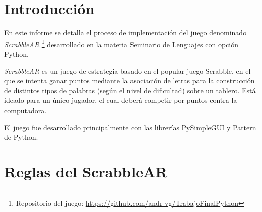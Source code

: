 \documentclass[11pt,fleqn]{book} %
\begin{document}

\pagestyle{empty} %

\tableofcontents %


\pagestyle{fancy} %



\chapter{Introducción}
\vspace*{1cm}


En este informe se detalla el proceso de implementación
del juego denominado \emph{ScrabbleAR} \footnote{Repositorio del juego: \url{https://github.com/andr-vg/TrabajoFinalPython}} desarrollado en la materia Seminario de Lenguajes con opción Python. 

\emph{ScrabbleAR} es un juego de estrategia basado en el popular juego Scrabble, en el que se intenta ganar puntos mediante la asociación de letras para la construcción de distintos tipos de palabras (según el nivel de dificultad) sobre un tablero.
Está ideado para un único jugador, el cual deberá competir por puntos contra la computadora.

El juego fue desarrollado principalmente con las librerías PySimpleGUI y Pattern de Python. 





\chapter{Reglas del ScrabbleAR}
\vspace*{1cm}
\end{document}
